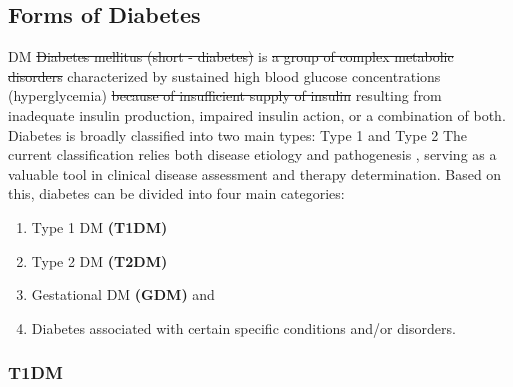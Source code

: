 \subsection{Forms of Diabetes} %
\label{sec:forsmDiabets}

DM \st{Diabetes mellitus (short - diabetes)} is \st{a group of complex metabolic disorders} characterized by sustained high blood glucose concentrations (hyperglycemia) \st{because of insufficient supply of insulin} resulting from inadequate insulin production, impaired insulin action, or a combination of both. Diabetes is broadly classified into two main types: Type 1 and Type 2  The current classification relies both disease etiology and pathogenesis \textbf{\cite{banday_pathophysiology_2020}}, serving as a valuable tool in clinical disease assessment and therapy determination. Based on this, diabetes can be divided into four main categories:\\
\begin{enumerate}
    \item Type 1 DM \textbf{(T1DM)}
    \item Type 2 DM \textbf{(T2DM)} 
    \item Gestational DM \textbf{(GDM)} and 
    \item Diabetes associated with certain specific conditions and/or disorders.
\end{enumerate}




\subsubsection{T1DM}


